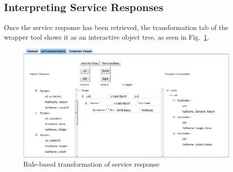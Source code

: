 % 
% 


\subsection{Interpreting Service Responses} %
\label{sub:interpreting_service_responses}



Once the service response has been retrieved, the transformation tab of the wrapper tool shows it as an interactive object tree, as seen in Fig.~\ref{fig:response_service_execution}. 

\begin{figure}
  \begin{center}
    \includegraphics[width=\linewidth]{images/ServiceWrapperToolGVSWithTransformationRules.png}
    \caption{Rule-based transformation of service response}
    \label{fig:response_service_execution}
  \end{center}
\end{figure}

